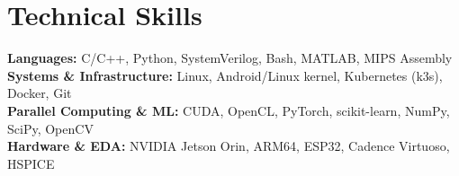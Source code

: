\documentclass[letterpaper,11pt]{article}
\begin{document}
\section{Technical Skills}
 \begin{itemize}[leftmargin=0.15in, label={}]
    \small{\item{
    \textbf{Languages:} C/C++, Python, SystemVerilog, Bash, MATLAB, MIPS Assembly \\[2pt]
    \textbf{Systems \& Infrastructure:} Linux, Android/Linux kernel, Kubernetes (k3s), Docker, Git \\[2pt]
    \textbf{Parallel Computing \& ML:} CUDA, OpenCL, PyTorch, scikit-learn, NumPy, SciPy, OpenCV \\[2pt]
    \textbf{Hardware \& EDA:} NVIDIA Jetson Orin, ARM64, ESP32, Cadence Virtuoso, HSPICE
    }}
 \end{itemize}
\end{document}
